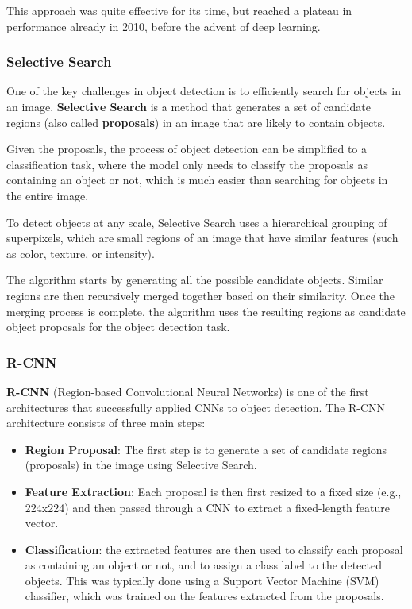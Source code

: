 This approach was quite effective for its time, but reached a plateau in performance already in 2010, before the advent of deep learning.

\subsubsection{Selective Search}
One of the key challenges in object detection is to efficiently search for objects in an image.
\textbf{Selective Search} is a method that generates a set of candidate regions (also called \textbf{proposals}) in an image that are likely to contain objects. 

Given the proposals, the process of object detection can be simplified to a classification task, where the model only needs to classify the proposals as containing an object or not,
which is much easier than searching for objects in the entire image.

To detect objects at any scale, Selective Search uses a hierarchical grouping of superpixels, which are small regions of an image that 
have similar features (such as color, texture, or intensity).

The algorithm starts by generating all the possible candidate objects. 
Similar regions are then recursively merged together based on their similarity. 
Once the merging process is complete, the algorithm uses the resulting regions as candidate object proposals for the object detection task.

\subsubsection{R-CNN}
\textbf{R-CNN} (Region-based Convolutional Neural Networks) is one of the first architectures that successfully applied CNNs to object detection. 
The R-CNN architecture consists of three main steps:
\begin{itemize}
    \item \textbf{Region Proposal}: The first step is to generate a set of candidate regions (proposals) in the image using Selective Search.
    
    \item \textbf{Feature Extraction}: Each proposal is then first resized to a fixed size (e.g., 224x224) and then passed through a CNN to extract a fixed-length feature vector.
    
    \item \textbf{Classification}: the extracted features are then used to classify each proposal as containing an object or not, and to assign a class label to the detected objects.
    This was typically done using a Support Vector Machine (SVM) classifier, which was trained on the features extracted from the proposals.
\end{itemize}

